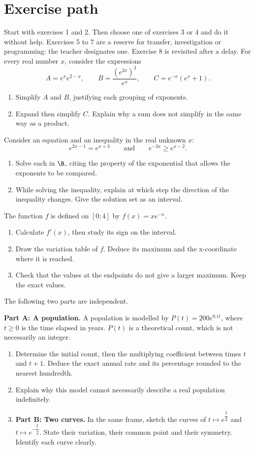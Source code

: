 \section*{Exercise path}\label{C09-PARC}
Start with exercises 1 and 2. Then choose one of exercises 3 or 4 and do it without help. Exercises 5 to 7 are a reserve for transfer, investigation or programming: the teacher designates one. Exercise 8 is revisited after a delay.
\begingroup
{}
For every real number $x$, consider the expressions\[A=e^xe^{2-x},\qquad B=\dfrac{(e^{2x})^3}{e^x},\qquad C=e^{-x}(e^x+1).\]
\begin{enumerate}[label=\arabic*.]
\item Simplify $A$ and $B$, justifying each grouping of exponents.
\item Expand then simplify $C$. Explain why a sum does not simplify in the same way as a product.
\end{enumerate}
Consider an equation and an inequality in the real unknown $x$:\[e^{2x-1}=e^{x+3}\qquad\text{and}\qquad e^{-3x}\geq e^{x-2}.\]
\begin{enumerate}[label=\arabic*.]
\item Solve each in $\R$, citing the property of the exponential that allows the exponents to be compared.
\item While solving the inequality, explain at which step the direction of the inequality changes. Give the solution set as an interval.
\end{enumerate}
The function $f$ is defined on $[0;4]$ by $f(x)=xe^{-x}$.
\begin{enumerate}[label=\arabic*.]
\item Calculate $f\prime(x)$, then study its sign on the interval.
\item Draw the variation table of $f$. Deduce its maximum and the x-coordinate where it is reached.
\item Check that the values at the endpoints do not give a larger maximum. Keep the exact values.
\end{enumerate}
The following two parts are independent.\par\textbf{Part A: A population.} A population is modelled by $P(t)=200e^{0.1t}$, where $t\geq0$ is the time elapsed in years. $P(t)$ is a theoretical count, which is not necessarily an integer.
\begin{enumerate}[label=\arabic*.]
\item Determine the initial count, then the multiplying coefficient between times $t$ and $t+1$. Deduce the exact annual rate and its percentage rounded to the nearest hundredth.
\item Explain why this model cannot necessarily describe a real population indefinitely.
\item \textbf{Part B: Two curves.} In the same frame, sketch the curves of $t\mapsto e^{\dfrac{t}{2}}$ and $t\mapsto e^{-\dfrac{t}{2}}$. State their variation, their common point and their symmetry. Identify each curve clearly.
\end{enumerate}
